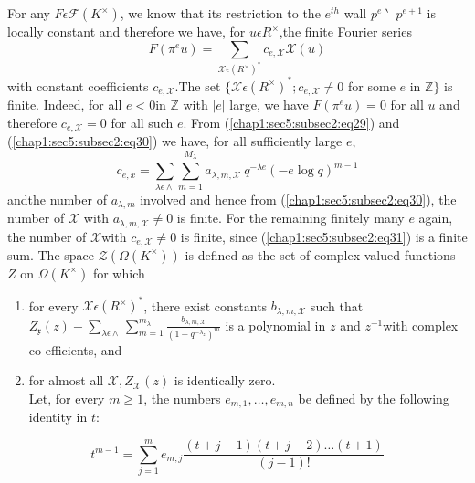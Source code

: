  For any $F\epsilon \mathscr{F}(K^{\times})$, we know that its
 restriction to the $e^{th}$ wall $p^{e} ~\backprime~$ $p^{e+1}$ is locally constant
 and therefore we have, for $u\epsilon R^{\times}$,the finite Fourier
 series
\begin{equation*}
F(\pi^{e}u)=\sum\limits_{\mathcal{X}\epsilon(R^{\times})^{\ast}}c_{e,\mathcal{X}}
\mathcal{X}(u)\tag{31} \label{chap1:sec5:subsec2:eq31}
\end{equation*}
with constant coefficients $c_{e, \mathcal{X}}$.The set
$\{\mathcal{X}\epsilon(R^{\times})^{\ast};c_{e,\mathcal{X}}\neq 0$ for
some $e$ in $\mathbb{Z}\}$ is finite. Indeed, for all
$e<0$in $\mathbb{Z}$ with $|e|$ large, we have $F(\pi^{e}u)=0$ for all
$u$ and therefore $c_{e,\mathcal{X}}=0$ for all such $e$. From
(\ref{chap1:sec5:subsec2:eq29}) 
and (\ref{chap1:sec5:subsec2:eq30}) we have, for all sufficiently large $e$,
\begin{equation*}
  c_{e,x}=\sum\limits_{\lambda \epsilon \wedge}
  \sum\limits_{m=1}^{M_{\lambda}} a_{\lambda,m,\mathcal{X}} ~ q^{-\lambda
  e}(-e \log q)^{m-1} \tag{32}\label{chap1:sec5:subsec2:eq32}
\end{equation*}
and\pageoriginale the number of $a_{\lambda,m}$ involved and hence from
(\ref{chap1:sec5:subsec2:eq30}), the
number of $\mathcal{X}$ with $a_{\lambda,m, \mathcal{X}}\neq 0$ is
finite. For the remaining finitely many $e$ again, the number of
$\mathcal{X}$with $c_{e,\mathcal{X}}\neq 0$ is finite, since
(\ref{chap1:sec5:subsec2:eq31}) is a finite sum. 
 The space $\mathscr{Z}(\Omega(K^{\times}))$ is defined as the set of
 complex-valued functions $Z$ on $\Omega(K^{\times})$ for which 
\begin{enumerate}
\renewcommand{\labelenumi}{(\theenumi)}
\item for every $\mathcal{X} \epsilon(R^{\times})^{\ast}$, there exist
  constants $b_{\lambda, m, \mathcal{X}}$ such that
  $Z_{\mathfrak{x}}(z)-\sum\limits_{\lambda \epsilon \wedge}
  \sum\limits_{m=1}^{m_{\lambda}}\frac{b_{\lambda,m,
      \mathcal{X}}}{(1-q^{-\lambda_{z}})^m}$ is a polynomial in $z$
  and $z^{-1}$with complex co-efficients, and  
\item for almost all $\mathcal{X},Z_{\mathcal{X}}(z)$ is identically zero.\\
      Let, for every $m\ge 1$, the numbers $e_{m,1},\ldots, e_{m,n}$
      be defined by the following identity in $t$: 
\end{enumerate}

\begin{equation*}
  t^{m-1}=\sum\limits_{j=1}^{m}e_{m,j} \frac{(t+j-1)(t+j-2) \ldots
    (t+1)}{(j-1)!}\tag{33}\label{chap1:sec5:subsec2:eq33} 
\end{equation*}

